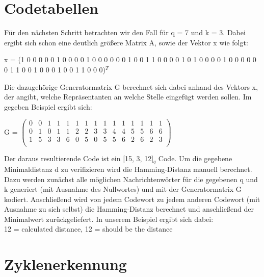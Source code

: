 \documentclass[12pt, titlepage]{article}
\begin{document}
	
\section{Codetabellen}

Für den nächsten Schritt betrachten wir den Fall für q = 7 und k = 3.
Dabei ergibt sich schon eine deutlich größere Matrix A, sowie der Vektor x wie folgt:
\begin{center}
x = (1 0 0 0 0 0 1 0 0 0 0 1 0 0 0 0 0 0 1 0 0 1 1 0 0 0 0 1 0 1 0 0 0 0 1 0 0 0 0 0 0 1 1 0 0 1 0 0 0 1 0 0 1 1 0 0 0)$^T$
\end{center}
Die dazugehörige Generatormatrix G berechnet sich dabei anhand des Vektors x, der angibt, welche Repräsentanten an welche Stelle eingefügt werden sollen.
Im gegeben Beispiel ergibt sich:
\begin{center}
\item
G = 	
$
\begin{pmatrix}
	0 & 0 & 1 & 1 & 1 & 1 & 1 & 1 & 1 & 1 & 1 & 1 & 1 & 1 & 1 \\
	0 & 1 & 0 & 1 & 1 & 2 & 2 & 3 & 3 & 4 & 4 & 5 & 5 & 6 & 6 \\
	1 & 5 & 3 & 3 & 6 & 0 & 5 & 0 & 5 & 5 & 6 & 2 & 6 & 2 & 3 \\
\end{pmatrix}
$
\end{center}

Der daraus resultierende Code ist ein [15, 3, 12]$_q$ Code.
Um die gegebene Minimaldistanz d zu verifizieren wird die Hamming-Distanz manuell berechnet.
Dazu werden zunächst alle möglichen Nachrichtenwörter für die gegebenen q und k generiert (mit Ausnahme des Nullwortes) und mit der Generatormatrix G kodiert.
Anschließend wird von jedem Codewort zu jedem anderen Codewort (mit Ausnahme zu sich selbst) die Hamming-Distanz berechnet und anschließend der Minimalwert zurückgeliefert.
In unserem Beispiel ergibt sich dabei: \\
12 = calculated distance, 12 = should be the distance \\







\section{Zyklenerkennung}
\end{document}
